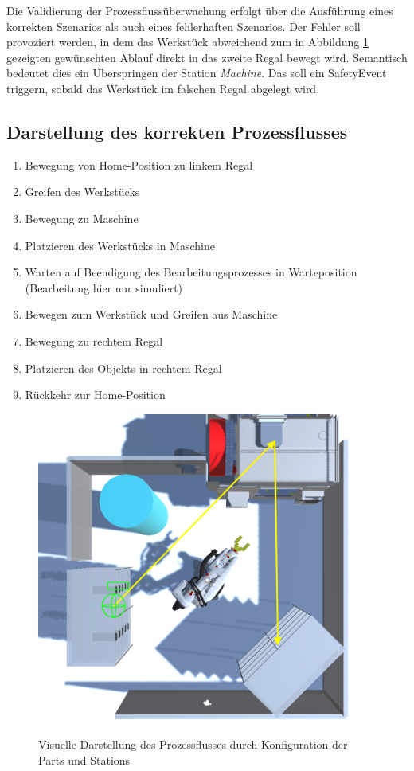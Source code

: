 Die Validierung der Prozessflussüberwachung erfolgt über die Ausführung eines
korrekten Szenarios als auch eines fehlerhaften Szenarios. Der Fehler soll
provoziert werden, in dem das Werkstück abweichend zum in Abbildung
\ref{figure:Prozessfluss} gezeigten gewünschten Ablauf direkt in das zweite
Regal bewegt wird. Semantisch bedeutet dies ein Überspringen der Station
\textit{Machine}. Das soll ein SafetyEvent triggern, sobald das Werkstück im
falschen Regal abgelegt wird.

\subsection{Darstellung des korrekten Prozessflusses}
\label{sec:korrekterProzess}
\begin{enumerate}
  \item Bewegung von Home-Position zu linkem Regal
  \item Greifen des Werkstücks
  \item Bewegung zu Maschine
  \item Platzieren des Werkstücks in Maschine
  \item Warten auf Beendigung des Bearbeitungsprozesses in
    Warteposition (Bearbeitung hier nur simuliert)
  \item Bewegen zum Werkstück und Greifen aus Maschine
  \item Bewegung zu rechtem Regal
  \item Platzieren des Objekts in rechtem Regal
  \item Rückkehr zur Home-Position
\end{enumerate}

\begin{figure}[H]
  \centering
  \includegraphics[width=0.7\linewidth]{Figures/Prozessfolge.png}
  \caption{Visuelle Darstellung des Prozessflusses durch Konfiguration der Parts
  und Stations}
  \label{figure:Prozessfluss}
\end{figure}

